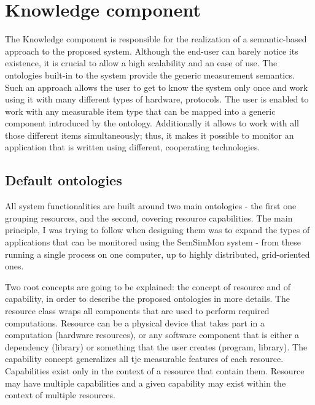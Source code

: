 %
\section{Knowledge component}
\label{sec:arch_knowledge}

The Knowledge component is responsible for the realization of a semantic-based approach to the proposed system. Although the end-user can barely notice its existence, it is crucial to allow a high scalability and an ease of use. The ontologies built-in to the system provide the generic measurement semantics. Such an approach allows the user to get to know the system only once and work using it with many different types of hardware, protocols. The user is enabled to work with any measurable item type that can be mapped into a generic component introduced by the ontology. Additionally it allows to work with all those different items simultaneously; thus, it makes it possible to monitor an application that is written using different, cooperating technologies.

\subsection{Default ontologies}

All system functionalities are built around two main ontologies - the first one grouping resources, and the second, covering resource capabilities. The main principle, I was trying to follow when designing them was to expand the types of applications that can be monitored using the SemSimMon system - from these running a single process on one computer, up to highly distributed, grid-oriented ones.

Two root concepts are going to be explained: the concept of resource and of capability, in order to describe the proposed ontologies in more details. The resource class wraps all components that are used to perform required computations. Resource can be a physical device that takes part in a computation (hardware resources), or any software component that is either a dependency (library) or something that the user creates (program, library). The capability concept generalizes all tje measurable features of each resource. Capabilities exist only in the context of a resource that contain them. Resource may have multiple capabilities and a given capability may exist within the context of multiple resources.

